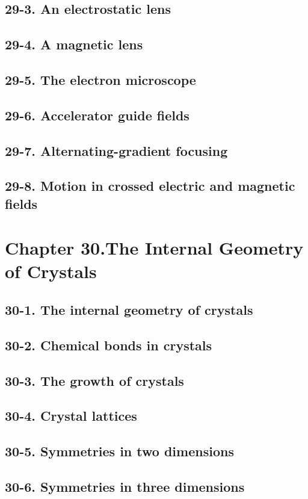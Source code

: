 \documentclass{article}
\begin{document}
\subsection{29-3. An electrostatic lens}
\subsection{29-4. A magnetic lens}
\subsection{29-5. The electron microscope}
\subsection{29-6. Accelerator guide fields}
\subsection{29-7. Alternating-gradient focusing}
\subsection{29-8. Motion in crossed electric and magnetic fields}
\section{Chapter 30.The Internal Geometry of Crystals}
\subsection{30-1. The internal geometry of crystals}
\subsection{30-2. Chemical bonds in crystals}
\subsection{30-3. The growth of crystals}
\subsection{30-4. Crystal lattices}
\subsection{30-5. Symmetries in two dimensions}
\subsection{30-6. Symmetries in three dimensions}
\end{document}
